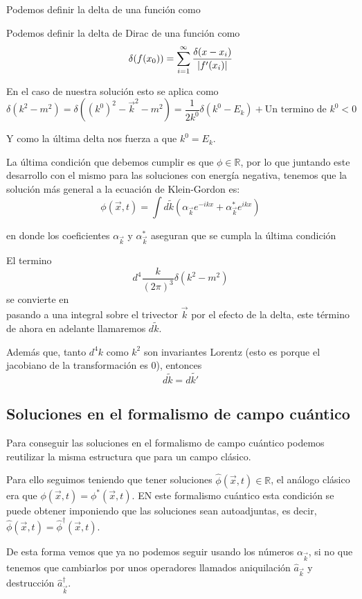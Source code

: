 Podemos definir la delta de una función como 
\begin{definition}
  Podemos definir la delta de Dirac de una función como 
  \[\delta(f(x_{0}))=\sum_{i=1}^{\infty} \frac{\delta(x-x_{i})}{\abs{f'(x_{i})}} \]
\end{definition}

En el caso de nuestra solución esto se aplica como 
\[\delta(k^{2}-m^{2})=\delta((k^{0})^{2}-\vec{k}^{2}-m^{2})=\frac{1}{2k^{0}}\delta(k^{0}-E_{k}) + \text{Un termino de }k^{0}<0\]

Y como la última delta nos fuerza a que $k^{0}=E_{k}$. 

La última condición que debemos cumplir es que $\phi\in \mathbb{R}$, por lo que juntando este desarrollo con el mismo para las soluciones con energía negativa, tenemos que la solución más general a la ecuación de Klein-Gordon es:
\[\phi(\vec{x},t)=\int d\tilde{k}(\alpha_{\vec{k}}e^{-ikx}+\alpha^{*}_{\vec{k}}e^{ikx})\]

en donde los coeficientes $\alpha_{\vec{k}}$ y $\alpha^{*}_{\vec{k}}$ aseguran que se cumpla la última condición


\begin{corollary}
  El termino 
  \[d^{4}\frac{k}{(2\pi)^{3}}\delta(k^{2}-m^{2})\]
  se convierte en 
  \[\]
  pasando a una integral sobre el trivector $\vec{k}$ por el efecto de la delta, este término de ahora en adelante llamaremos $d \tilde{k}$. 

  Además que, tanto $d^{4}k$ como $k^{2}$ son invariantes Lorentz (esto es porque el jacobiano de la transformación es $0$), entonces 
  \[d \tilde{k}=d \tilde{k'}\]
\end{corollary}
\subsection{Soluciones en el formalismo de campo cuántico}

Para conseguir las soluciones en el formalismo de campo cuántico podemos reutilizar la misma estructura que para un campo clásico. 

Para ello seguimos teniendo que tener soluciones $\hat{\phi}(\vec{x},t)\in \mathbb{R}$, el análogo clásico era que $\phi(\vec{x},t)=\phi^{*}(\vec{x},t)$. EN este formalismo cuántico esta condición se puede obtener imponiendo que las soluciones sean autoadjuntas, es decir, $\hat{\phi}(\vec{x},t)=\hat{\phi}^{\dagger}(\vec{x},t)$.

De esta forma vemos que ya no podemos seguir usando los números $\alpha_{\vec{k}}$, si no que tenemos que cambiarlos por unos operadores llamados  aniquilación $\hat{a}_{\vec{k}}$ y destrucción $\hat{a}^{\dagger}_{\vec{k}}$.

